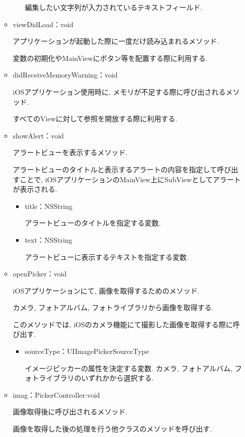 \begin{itemize}
\begin{itemize}
\begin{itemize}
編集したい文字列が入力されているテキストフィールド.
\end{itemize}

\item viewDidLoad：void

アプリケーションが起動した際に一度だけ読み込まれるメソッド.

変数の初期化やMainViewにボタン等を配置する際に利用する.

\item didReceiveMemoryWarning：void

iOSアプリケーション使用時に, メモリが不足する際に呼び出されるメソッド.

すべてのViewに対して参照を開放する際に利用する.

\item showAlert：void

アラートビューを表示するメソッド.

アラートビューのタイトルと表示するアラートの内容を指定して呼び出すことで, iOSアプリケーションのMainView上にSubViewとしてアラートが表示される.

\begin{itemize}
\item title：NSString

アラートビューのタイトルを指定する変数.

\item text：NSString

アラートビューに表示するテキストを指定する変数.
\end{itemize}

\item openPicker：void

iOSアプリケーションにて, 画像を取得するためのメソッド.

カメラ, フォトアルバム, フォトライブラリから画像を取得する.

このメソッドでは, iOSのカメラ機能にて撮影した画像を取得する際に呼び出す.

\begin{itemize}
\item sourceType：UIImagePickerSourceType

イメージピッカーの属性を決定する変数.
カメラ, フォトアルバム, フォトライブラリのいずれかから選択する.
\end{itemize}

\item imag：PickerController:void

画像取得後に呼び出されるメソッド.

画像を取得した後の処理を行う他クラスのメソッドを呼び出す.


\end{itemize}
\end{itemize}
